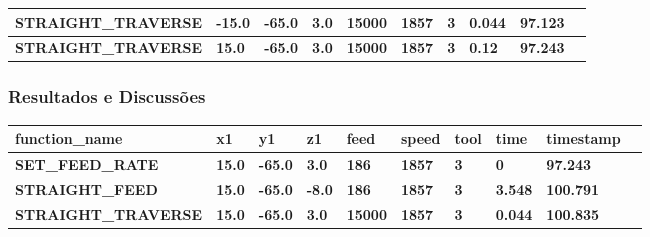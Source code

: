 \documentclass[aspectratio=169]{beamer}
\begin{document}
{\begin{frame}[fragile]
\begin{tabular}{|l|l|l|l|l|l|l|l|l|l|}
    \tiny{\bfseries{STRAIGHT\_TRAVERSE}} & 
    \tiny{\bfseries{-15.0}} & 
    \tiny{\bfseries{-65.0}} & 
    \tiny{\bfseries{3.0}} & 
    \tiny{\bfseries{15000}} & 
    \tiny{\bfseries{1857}} & 
    \tiny{\bfseries{3}} & 
    \tiny{\bfseries{0.044}} & 
    \tiny{\bfseries{97.123}} \\
    \hline    

    \tiny{\bfseries{STRAIGHT\_TRAVERSE}} & 
    \tiny{\bfseries{15.0}} & 
    \tiny{\bfseries{-65.0}} & 
    \tiny{\bfseries{3.0}} & 
    \tiny{\bfseries{15000}} & 
    \tiny{\bfseries{1857}} & 
    \tiny{\bfseries{3}} & 
    \tiny{\bfseries{0.12}} & 
    \tiny{\bfseries{97.243}} \\
    \hline

  \end{tabular}

\end{frame}  


\begin{frame}[fragile]
  \frametitle{Resultados e Discussões}  

    \begin{tabular}{|l|l|l|l|l|l|l|l|l|l|}

      \hline

      \tiny{\bfseries{function\_name}} & 
      \tiny{\bfseries{x1}} & 
      \tiny{\bfseries{y1}} & 
      \tiny{\bfseries{z1}} & 
      \tiny{\bfseries{feed}} & 
      \tiny{\bfseries{speed}} & 
      \tiny{\bfseries{tool}} & 
      \tiny{\bfseries{time}} & 
      \tiny{\bfseries{timestamp}} \\
      \hline
    

      \tiny{\bfseries{SET\_FEED\_RATE}} & 
      \tiny{\bfseries{15.0}} & 
      \tiny{\bfseries{-65.0}} & 
      \tiny{\bfseries{3.0}} & 
      \tiny{\bfseries{186}} & 
      \tiny{\bfseries{1857}} & 
      \tiny{\bfseries{3}} & 
      \tiny{\bfseries{0}} & 
      \tiny{\bfseries{97.243}} \\
      \hline

      \tiny{\bfseries{STRAIGHT\_FEED}} & 
      \tiny{\bfseries{15.0}} & 
      \tiny{\bfseries{-65.0}} & 
      \tiny{\bfseries{-8.0}} & 
      \tiny{\bfseries{186}} & 
      \tiny{\bfseries{1857}} & 
      \tiny{\bfseries{3}} & 
      \tiny{\bfseries{3.548}} & 
      \tiny{\bfseries{100.791}} \\
      \hline

      \tiny{\bfseries{STRAIGHT\_TRAVERSE}} & 
      \tiny{\bfseries{15.0}} & 
      \tiny{\bfseries{-65.0}} & 
      \tiny{\bfseries{3.0}} & 
      \tiny{\bfseries{15000}} & 
      \tiny{\bfseries{1857}} & 
      \tiny{\bfseries{3}} & 
      \tiny{\bfseries{0.044}} & 
      \tiny{\bfseries{100.835}} \\
      \hline


\end{tabular}
\end{frame}}
\end{document}
